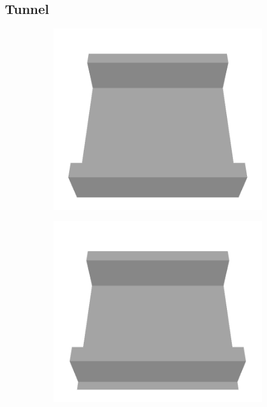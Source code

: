 \subsection{Tunnel}

\begin{figure}[H]
    \centering
    \begin{subfigure}[b]{0.24\textwidth}
    \includegraphics[width=\linewidth]{../img/5/custom_patches/tunnel/all/00-3d.png}
    \end{subfigure}
    \begin{subfigure}[b]{0.24\textwidth}
    \includegraphics[width=\linewidth]{../img/5/custom_patches/tunnel/all/04-3d.png}

\end{subfigure}
\end{figure}
